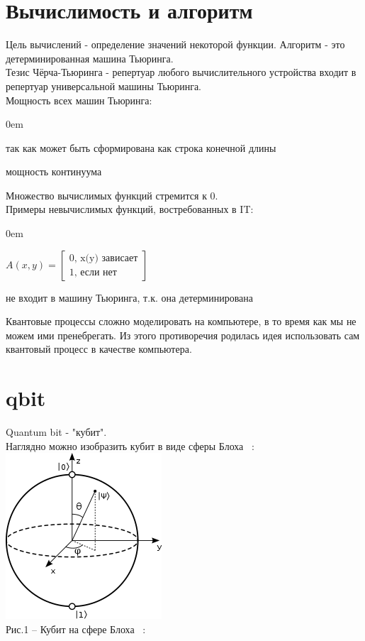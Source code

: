 \documentclass[11pt]{report}
\begin{document}
\section{Вычислимость и алгоритм}
Цель вычислений - определение значений некоторой функции. Алгоритм - это детерминированная машина Тьюринга. \\
Тезис Чёрча-Тьюринга - репертуар любого вычислительного устройства входит в репертуар универсальной машины Тьюринга.\\
Мощность всех машин Тьюринга:
\begin{description}
\addtolength{\itemindent}{0.80cm}
\itemsep0em 
\item[мощность счетного множества] так как может быть сформирована как строка конечной длины
\item[мощность множества функций] мощность континуума
\end{description}
Множество вычислимых функций стремится к 0.\\
Примеры невычислимых функций, востребованных в IT:
\begin{description}
\addtolength{\itemindent}{0.80cm}
\itemsep0em 
\item[анализатор зависания] $A(x,y) = \begin{bmatrix}
0 \text{, x(y) зависает}\\
1 \text{, если нет}
\end{bmatrix}$

\item[генератор случайных чисел] не входит в машину Тьюринга, т.к. она детерминирована
\end{description}
Квантовые процессы сложно моделировать на компьютере, в то время как мы не можем ими пренебрегать. Из этого противоречия родилась идея использовать сам квантовый процесс в качестве компьютера.

\section{qbit}
Quantum bit - "кубит". \\

Наглядно можно изобразить кубит в виде сферы Блоха ~\cite{bloch}: \\
\includegraphics[scale=0.4]{bloch}\\
Рис.1 -- Кубит на сфере Блоха ~\cite{qbit}:\\
\end{document}
